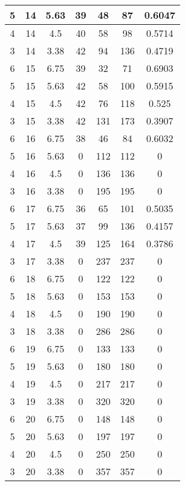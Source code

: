 \documentclass[letterpaper, 12pt]{article}
\begin{document}
\begin{longtable}{|c|c|c|c|c|c|c|}
\hline
5 & 14 & 5.63 & 39 & 48 & 87 & 0.6047 \\
\hline
4 & 14 & 4.5 & 40 & 58 & 98 & 0.5714 \\
\hline
3 & 14 & 3.38 & 42 & 94 & 136 & 0.4719 \\
\hline
6 & 15 & 6.75 & 39 & 32 & 71 & 0.6903 \\
\hline
5 & 15 & 5.63 & 42 & 58 & 100 & 0.5915 \\
\hline
4 & 15 & 4.5 & 42 & 76 & 118 & 0.525 \\
\hline
3 & 15 & 3.38 & 42 & 131 & 173 & 0.3907 \\
\hline
6 & 16 & 6.75 & 38 & 46 & 84 & 0.6032 \\
\hline
5 & 16 & 5.63 & 0 & 112 & 112 & 0 \\
\hline
4 & 16 & 4.5 & 0 & 136 & 136 & 0 \\
\hline
3 & 16 & 3.38 & 0 & 195 & 195 & 0 \\
\hline
6 & 17 & 6.75 & 36 & 65 & 101 & 0.5035 \\
\hline
5 & 17 & 5.63 & 37 & 99 & 136 & 0.4157 \\
\hline
4 & 17 & 4.5 & 39 & 125 & 164 & 0.3786 \\
\hline
3 & 17 & 3.38 & 0 & 237 & 237 & 0 \\
\hline
6 & 18 & 6.75 & 0 & 122 & 122 & 0 \\
\hline
5 & 18 & 5.63 & 0 & 153 & 153 & 0 \\
\hline
4 & 18 & 4.5 & 0 & 190 & 190 & 0 \\
\hline
3 & 18 & 3.38 & 0 & 286 & 286 & 0 \\
\hline
6 & 19 & 6.75 & 0 & 133 & 133 & 0 \\
\hline
5 & 19 & 5.63 & 0 & 180 & 180 & 0 \\
\hline
4 & 19 & 4.5 & 0 & 217 & 217 & 0 \\
\hline
3 & 19 & 3.38 & 0 & 320 & 320 & 0 \\
\hline
6 & 20 & 6.75 & 0 & 148 & 148 & 0 \\
\hline
5 & 20 & 5.63 & 0 & 197 & 197 & 0 \\
\hline
4 & 20 & 4.5 & 0 & 250 & 250 & 0 \\
\hline
3 & 20 & 3.38 & 0 & 357 & 357 & 0 \\
\hline
\end{longtable}
\end{document}

